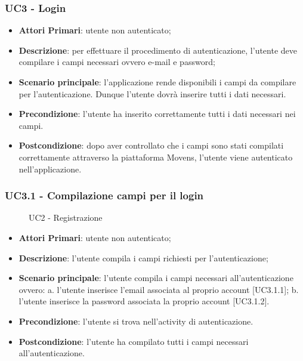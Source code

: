 \subsubsection{UC3 - Login}
\begin{itemize}
	\item \textbf{Attori Primari}: utente non autenticato;
	\item \textbf{Descrizione}: per effettuare il procedimento di autenticazione, l'utente deve compilare i campi necessari ovvero e-mail e password;
	\item \textbf{Scenario principale}: l'applicazione rende disponibili i campi da compilare per l'autenticazione. Dunque l'utente dovrà inserire tutti i dati necessari.
	
	\item \textbf{Precondizione}: l'utente ha inserito correttamente tutti i dati necessari nei campi.
	\item \textbf{Postcondizione}: dopo aver controllato che i campi sono stati compilati correttamente attraverso la piattaforma Movens, l'utente viene autenticato nell'applicazione.	
\end{itemize}

\subsubsection{UC3.1 - Compilazione campi per il login}
\begin{figure}[h]
	\centering
	\caption{UC2 - Registrazione}
\end{figure}
\begin{itemize}
	\item \textbf{Attori Primari}: utente non autenticato;
	\item \textbf{Descrizione}: l'utente compila i campi richiesti per l'autenticazione;
	\item \textbf{Scenario principale}: l'utente compila i campi necessari all'autenticazione ovvero: 
	\newline
	a. l'utente inserisce l'email associata al proprio account [UC3.1.1];
	\newline
	b. l'utente inserisce la password associata la proprio account [UC3.1.2].	
	\item \textbf{Precondizione}: l'utente si trova nell'activity di autenticazione.
	\item \textbf{Postcondizione}: l'utente ha compilato tutti i campi necessari all'autenticazione.	
\end{itemize}


